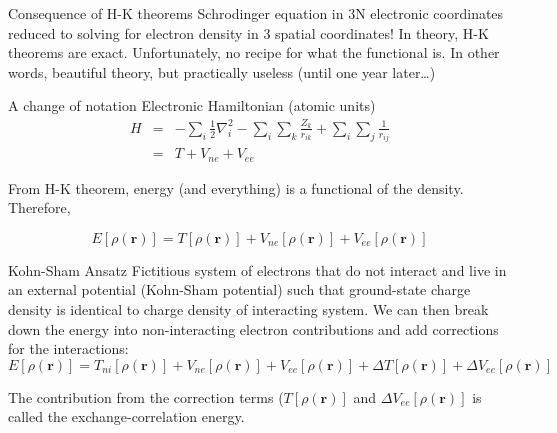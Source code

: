\documentclass[aspectratio=169]{beamer}
\let \vec \mathbf
\begin{document}
\begin{frame}{Consequence of H-K theorems}
Schrodinger equation in 3N electronic coordinates reduced to solving for electron density in 3 spatial coordinates!\newline
\newline
In theory, H-K theorems are exact.\newline
\newline
Unfortunately, no recipe for what the functional is.\newline
\newline
In other words, beautiful theory, but practically useless (until one year later…)

\end{frame} 


\begin{frame}{A change of notation}
Electronic Hamiltonian (atomic units)
\begin{eqnarray*}
    H & = & -\sum_i \frac{1}{2}\nabla_i^2
    -\sum_i\sum_k \frac{Z_k}{r_{ik}}
    +\sum_i\sum_j \frac{1}{r_{ij}}\\
    & = & T + V_{ne} + V_{ee}
\end{eqnarray*}

From H-K theorem, energy (and everything) is a functional of the density. Therefore,

\begin{equation*}
    E[\rho(\vec{r})] = T[\rho(\vec{r})] + V_{ne}[\rho(\vec{r})] + V_{ee}[\rho(\vec{r})]
\end{equation*}

\end{frame} 


\begin{frame}{Kohn-Sham Ansatz}
Fictitious system of electrons that do not interact and live in an external potential (Kohn-Sham potential) such that ground-state charge density is identical to charge density of interacting system.\cite{shamDensityFunctionalTheoryEnergy1983} We can then break down the energy into non-interacting electron contributions and add corrections for the interactions:
\begin{equation*}
    E[\rho(\vec{r})] = T_{ni}[\rho(\vec{r})] + V_{ne}[\rho(\vec{r})] + V_{ee}[\rho(\vec{r})] + \Delta T[\rho(\vec{r})] + \Delta V_{ee} [\rho(\vec{r})]
\end{equation*}

The contribution from the correction terms ($T[\rho(\vec{r})]$ and $\Delta V_{ee} [\rho(\vec{r})]$ is called the exchange-correlation energy.

\end{frame} 
\end{document}
